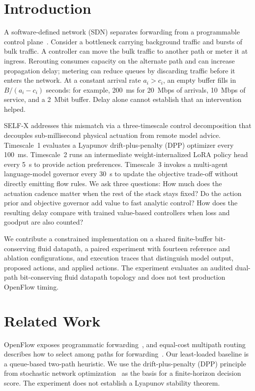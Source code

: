\documentclass[conference]{IEEEtran}
\begin{document}
\section{Introduction}
A software-defined network (SDN) separates forwarding from a programmable control plane~\cite{mckeown2008openflow}. Consider a bottleneck carrying background traffic and bursts of bulk traffic. A controller can move the bulk traffic to another path or meter it at ingress. Rerouting consumes capacity on the alternate path and can increase propagation delay; metering can reduce queues by discarding traffic before it enters the network. At a constant arrival rate \(a_i>c_i\), an empty buffer fills in \(B/(a_i-c_i)\) seconds: for example, 200~ms for 20~Mbps of arrivals, 10~Mbps of service, and a 2~Mbit buffer. Delay alone cannot establish that an intervention helped.

SELF-X addresses this mismatch via a three-timescale control decomposition that decouples sub-millisecond physical actuation from remote model advice. Timescale~1 evaluates a Lyapunov drift-plus-penalty (DPP) optimizer every 100~ms. Timescale~2 runs an intermediate weight-internalized LoRA policy head every 5~s to provide action preferences. Timescale~3 invokes a multi-agent language-model governor every 30~s to update the objective trade-off without directly emitting flow rules. We ask three questions: How much does the actuation cadence matter when the rest of the stack stays fixed? Do the action prior and objective governor add value to fast analytic control? How does the resulting delay compare with trained value-based controllers when loss and goodput are also counted?

We contribute a constrained implementation on a shared finite-buffer bit-conserving fluid datapath, a paired experiment with fourteen reference and ablation configurations, and execution traces that distinguish model output, proposed actions, and applied actions. The experiment evaluates an audited dual-path bit-conserving fluid datapath topology and does not test production OpenFlow timing.

\section{Related Work}
OpenFlow exposes programmatic forwarding~\cite{mckeown2008openflow}, and equal-cost multipath routing describes how to select among paths for forwarding~\cite{hopps2000ecmp}. Our least-loaded baseline is a queue-based two-path heuristic. We use the drift-plus-penalty (DPP) principle from stochastic network optimization~\cite{neely2010stochastic} as the basis for a finite-horizon decision score. The experiment does not establish a Lyapunov stability theorem.
\end{document}
